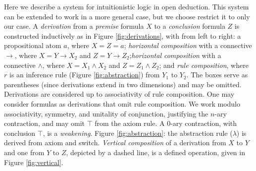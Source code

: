 \documentclass[a4paper,UKenglish,cleveref, autoref]{lipics-v2019}
\begin{document}
Here we describe a system for intuitionistic logic in open deduction. This system can be extended to work in a more general case, but we choose restrict it to only our case. A \emph{derivation} from a \emph{premise} formula $X$ to a \emph{conclusion} formula $Z$ is constructed inductively as in Figure \ref{fig:derivations}, with from left to right: a propositional atom $a$, where $X = Z = a$; \emph{horizontal composition} with a connective $\rightarrow$, where $X = Y \rightarrow X_{2}$ and $Z = Y \rightarrow Z_{2}$;\emph{horizontal composition} with a connective $\wedge$, where $X = X_{1} \wedge X_{2}$ and $Z = Z_{1} \wedge Z_{2}$; and \emph{rule composition}, where $r$ is an inference rule (Figure \ref{fig:abstraction}) from $Y_{1}$ to $Y_{2}$. The boxes serve as parentheses (since derivations extend in two dimensions) and may be omitted. Derivations are considered up to associativity of rule composition. One may consider formulas as derivations that omit rule composition. We work modulo associativity, symmetry, and unitality of conjunction, justifying the $n$-ary contraction, and may omit $\top$ from the axiom rule. A $0$-ary contraction, with conclusion $\top$, is a \emph{weakening}. Figure \ref{fig:abstraction}: the abstraction rule ($\lambda$) is derived from axiom and switch. \emph{Vertical composition} of a derivation from $X$ to $Y$ and one from $Y$ to $Z$, depicted by a dashed line, is a defined operation, given in Figure \ref{fig:vertical}.

\end{document}
